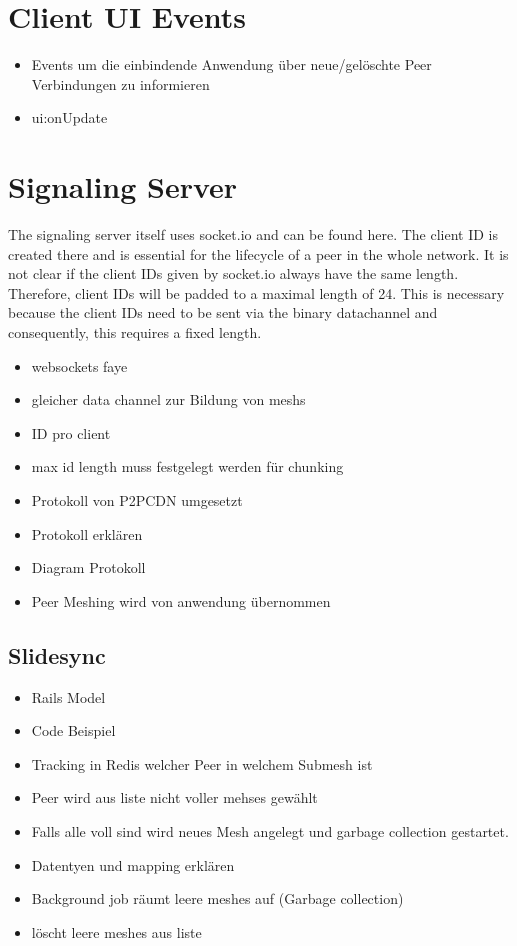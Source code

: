 \section{Client UI Events}
\begin{itemize}
	\item Events um die einbindende Anwendung über neue/gelöschte Peer Verbindungen zu informieren
	\item ui:onUpdate
\end{itemize}
\section{Signaling Server}
The signaling server itself uses socket.io and can be found here. The client ID is created there and is essential for the lifecycle of a peer in the whole network. It is not clear if the client IDs given by socket.io always have the same length. Therefore, client IDs will be padded to a maximal length of 24. This is necessary because the client IDs need to be sent via the binary datachannel and consequently, this requires a fixed length.


\begin{itemize}
  \item websockets faye
  \item gleicher data channel zur Bildung von meshs
  \item ID pro client
  \item max id length muss festgelegt werden für chunking
  \item Protokoll von P2PCDN umgesetzt
  \item Protokoll erklären
  \item Diagram Protokoll
  \item Peer Meshing wird von anwendung übernommen
\end{itemize}

\subsection{Slidesync}
\begin{itemize}
	\item Rails Model
	\item Code Beispiel
	\item Tracking in Redis welcher Peer in welchem Submesh ist
	\item Peer wird aus liste nicht voller mehses gewählt
	\item Falls alle voll sind wird neues Mesh angelegt und garbage collection gestartet.
	\item Datentyen und mapping erklären
	\item Background job räumt leere meshes auf (Garbage collection)
	\item 	löscht leere meshes aus liste
\end{itemize}

